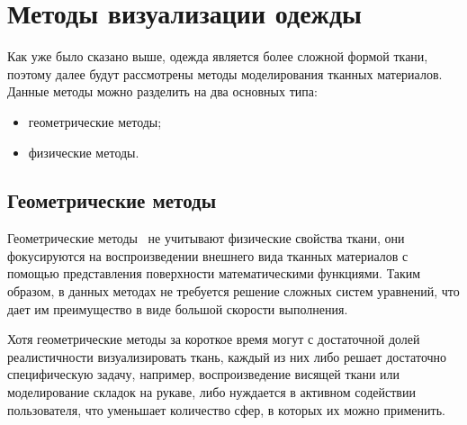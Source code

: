 \section{Методы визуализации одежды}

Как уже было сказано выше, одежда является более сложной формой ткани,
поэтому далее будут рассмотрены методы моделирования тканных материалов.
Данные методы можно разделить на два основных типа:
\begin{itemize}[left=\parindent]
    \item геометрические методы;
    \item физические методы.
\end{itemize}

\subsection{Геометрические методы}

Геометрические методы~\cite{bib07} не учитывают физические свойства ткани, они
фокусируются на воспроизведении внешнего вида тканных материалов с помощью
представления поверхности математическими функциями. Таким образом, в данных
методах не требуется решение сложных систем уравнений, что дает им преимущество
в виде большой скорости выполнения.

Хотя геометрические методы за короткое время могут с достаточной долей
реалистичности визуализировать ткань, каждый из них либо решает достаточно
специфическую задачу, например, воспроизведение висящей ткани или моделирование
складок на рукаве, либо нуждается в активном содействии пользователя, что
уменьшает количество сфер, в которых их можно применить.

